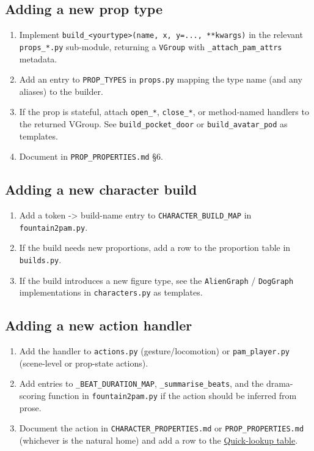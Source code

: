 \documentclass[
  11pt,
]{book}
\providecommand{\tightlist}{%
  \setlength{\itemsep}{0pt}\setlength{\parskip}{0pt}}
\begin{document}
\subsection{Adding a new prop type}\label{adding-a-new-prop-type}

\begin{enumerate}
\def\labelenumi{\arabic{enumi}.}
\tightlist
\item
  Implement
  \texttt{build\_\textless{}yourtype\textgreater{}(name,\ x,\ y=...,\ **kwargs)}
  in the relevant \texttt{props\_*.py} sub-module, returning a
  \texttt{VGroup} with \texttt{\_attach\_pam\_attrs} metadata.
\item
  Add an entry to \texttt{PROP\_TYPES} in \texttt{props.py} mapping the
  type name (and any aliases) to the builder.
\item
  If the prop is stateful, attach \texttt{open\_*}, \texttt{close\_*},
  or method-named handlers to the returned VGroup. See
  \texttt{build\_pocket\_door} or \texttt{build\_avatar\_pod} as
  templates.
\item
  Document in \texttt{PROP\_PROPERTIES.md} §6.
\end{enumerate}

\subsection{Adding a new character
build}\label{adding-a-new-character-build}

\begin{enumerate}
\def\labelenumi{\arabic{enumi}.}
\tightlist
\item
  Add a token -\textgreater{} build-name entry to
  \texttt{CHARACTER\_BUILD\_MAP} in \texttt{fountain2pam.py}.
\item
  If the build needs new proportions, add a row to the proportion table
  in \texttt{builds.py}.
\item
  If the build introduces a new figure type, see the \texttt{AlienGraph}
  / \texttt{DogGraph} implementations in \texttt{characters.py} as
  templates.
\end{enumerate}

\subsection{Adding a new action
handler}\label{adding-a-new-action-handler}

\begin{enumerate}
\def\labelenumi{\arabic{enumi}.}
\tightlist
\item
  Add the handler to \texttt{actions.py} (gesture/locomotion) or
  \texttt{pam\_player.py} (scene-level or prop-state actions).
\item
  Add entries to \texttt{\_BEAT\_DURATION\_MAP},
  \texttt{\_summarise\_beats}, and the drama-scoring function in
  \texttt{fountain2pam.py} if the action should be inferred from prose.
\item
  Document the action in \texttt{CHARACTER\_PROPERTIES.md} or
  \texttt{PROP\_PROPERTIES.md} (whichever is the natural home) and add a
  row to the \hyperref[quick-lookup-table]{Quick-lookup table}.
\end{enumerate}
\end{document}
